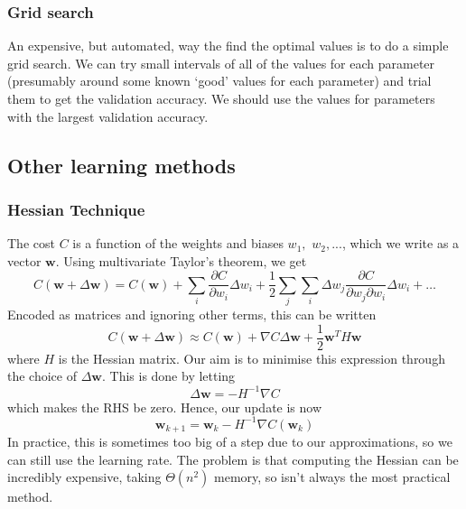 \documentclass[10pt]{article}
\begin{document}
\subsubsection{Grid search}
An expensive, but automated, way the find the optimal values is to do a simple grid search. We can try small intervals of all of the values for each parameter (presumably around some known `good' values for each parameter) and trial them to get the validation accuracy. We should use the values for parameters with the largest validation accuracy.

\subsection{Other learning methods}
\subsubsection{Hessian Technique}
The cost $C$ is a function of the weights and biases $w_1,$ $w_2,...$, which we write as a vector $\textbf{w}$. Using multivariate Taylor's theorem, we get
\[
C(\textbf{w}+ \Delta \textbf{w}) = C(\textbf{w}) + \sum_i \frac{\partial C}{\partial w_i} \Delta w_i + \frac{1}{2} \sum_j \sum_i \Delta w_j \frac{\partial C}{\partial w_j \partial w_i} \Delta w_i + \dots 
\]
Encoded as matrices and ignoring other terms, this can be written
\[
C(\textbf{w}+ \Delta \textbf{w}) \approx C(\textbf{w}) + \nabla C  \Delta \textbf{w}  +  \frac{1}{2} \textbf{w}^{T}H\textbf{w}
\]
where $H$ is the Hessian matrix. Our aim is to minimise this expression through the choice of $\Delta\textbf{w}$. This is done by letting
\[
\Delta\textbf{w} = -H^{-1}\nabla C
\]
which makes the RHS be zero. Hence, our update is now
\[
\mathbf{w}_{k+1} = \mathbf{w}_k -H^{-1}\nabla C(\mathbf{w}_k) 
\]
In practice, this is sometimes too big of a step due to our approximations, so we can still use the learning rate. The problem is that computing the Hessian can be incredibly expensive, taking $\Theta(n^2)$ memory, so isn't always the most practical method.
\end{document}
